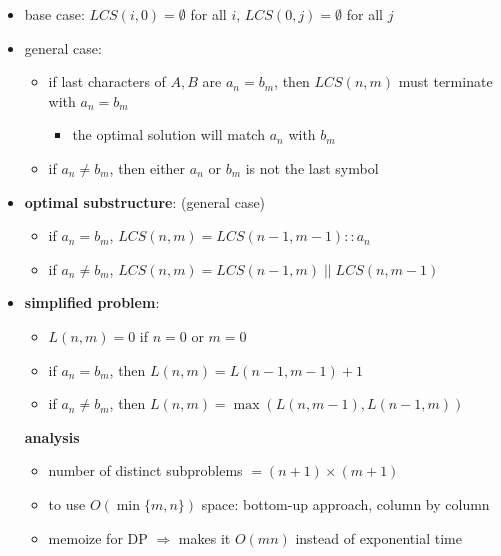 \documentclass[10pt,landscape]{article}
\newcommand{\1}{\mathmybb{1}}
\begin{document}
\begin{multicols*}{3}
\begin{itemize}[topsep=0pt,noitemsep,wide=0pt, leftmargin=\dimexpr{} + 2\relax]
  \item base case: $LCS(i, 0) = \emptyset$ for all $i$, $LCS(0, j) = \emptyset$ for all $j$ 
  \item general case:
    \begin{itemize}[topsep=0pt,noitemsep,wide=0pt, leftmargin=\dimexpr{} + 2\relax]
      \item if last characters of $A, B$ are $a_n = b_m$, then $LCS(n, m)$ must terminate with $a_n=b_m$ 
        \begin{itemize}[topsep=0pt,noitemsep,wide=0pt, leftmargin=\dimexpr{} + 2\relax]
          \item the optimal solution will match $a_n$ with $b_m$
        \end{itemize}
      \item if $a_n \neq b_m$, then either $a_n$ or $b_m$ is not the last symbol
    \end{itemize}
  \item \textbf{optimal substructure}: (general case)
    \begin{itemize}[topsep=0pt,noitemsep,wide=0pt, leftmargin=\dimexpr{} + 2\relax]
      \item if $a_n = b_m$, $LCS(n, m) = LCS(n-1, m-1) :: a_n$
      \item if $a_n \neq b_m$, $LCS(n, m) = LCS(n-1, m) \; || \; LCS(n, m-1)$
    \end{itemize}
  \item \textbf{simplified problem}: 
    \begin{itemize}[topsep=0pt,noitemsep,wide=0pt, leftmargin=\dimexpr{} + 2\relax]
      \item $L(n, m) = 0$ if $n=0$ or $m=0$ 
      \item if $a_n = b_m$, then $L(n, m) = L(n-1, m-1) + 1$ 
      \item if $a_n \neq b_m$, then $L(n, m) = \max (L(n, m-1), L(n-1, m)) $
    \end{itemize}
    \textbf{analysis}
    \begin{itemize}[topsep=0pt,noitemsep,wide=0pt, leftmargin=\dimexpr{} + 2\relax]
      \item number of distinct subproblems $= (n+1) \times (m+1)$
      \item to use $O(\min \{m, n\})$ space: bottom-up approach, column by column 
      \item memoize for DP $\Rightarrow$ makes it $O(mn)$ instead of exponential time
    \end{itemize}
\end{itemize}


\end{multicols*}
\end{document}
